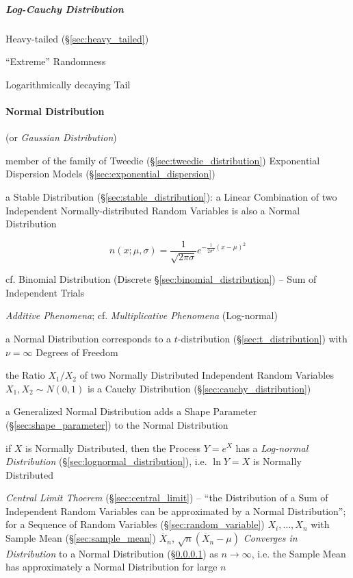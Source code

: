 \subparagraph{Log-Cauchy Distribution}\label{sec:log_cauchy}\hfill

Heavy-tailed (\S\ref{sec:heavy_tailed})

``Extreme'' Randomness

Logarithmically decaying Tail



\paragraph{Normal Distribution}\label{sec:normal_distribution}\hfill

(or \emph{Gaussian Distribution})

member of the family of Tweedie (\S\ref{sec:tweedie_distribution}) Exponential
Dispersion Models (\S\ref{sec:exponential_dispersion})

a Stable Distribution (\S\ref{sec:stable_distribution}): a Linear Combination of
two Independent Normally-distributed Random Variables is also a Normal
Distribution

\[
  n (x; \mu, \sigma) =
  \frac{1}{\sqrt{2\pi \sigma}} e^{-\frac{1}{2 \sigma^2}(x - \mu)^2}
\]

cf. Binomial Distribution (Discrete \S\ref{sec:binomial_distribution})
-- Sum of Independent Trials

\emph{Additive Phenomena}; cf. \emph{Multiplicative Phenomena} (Log-normal)

a Normal Distribution corresponds to a $t$-distribution
(\S\ref{sec:t_distribution}) with $\nu = \infty$ Degrees of Freedom

the Ratio $X_1/X_2$ of two Normally Distributed Independent Random Variables
$X_1, X_2 \sim N(0,1)$ is a Cauchy Distribution
(\S\ref{sec:cauchy_distribution})

\fist a Generalized Normal Distribution adds a Shape Parameter
(\S\ref{sec:shape_parameter}) to the Normal Distribution

if $X$ is Normally Distributed, then the Process $Y = e^X$ has a
\emph{Log-normal Distribution} (\S\ref{sec:lognormal_distribution}), i.e. $\ln Y
= X$ is Normally Distributed

\emph{Central Limit Thoerem} (\S\ref{sec:central_limit}) -- ``the Distribution
of a Sum of Independent Random Variables can be approximated by a Normal
Distribution'';
for a Sequence of Random Variables (\S\ref{sec:random_variable})
$X_i, \ldots, X_n$ with Sample Mean (\S\ref{sec:sample_mean})
$\overline{X}_n$, $\sqrt{n}(\overline{X}_n - \mu)$
\emph{Converges in Distribution} to a Normal Distribution
(\S\ref{sec:normal_distribution}) as $n \to \infty$, i.e. the Sample
Mean has approximately a Normal Distribution for large $n$

